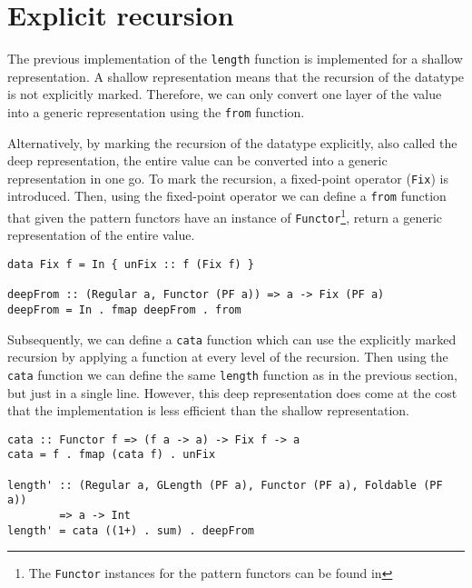 \section{Explicit recursion}
\label{sec-explicit-recursion}


The previous implementation of the \texttt{length} function is implemented for a shallow representation. A shallow representation means that the recursion of the datatype is not explicitly marked. Therefore, we can only convert one layer of the value into a generic representation using the \texttt{from} function. 

Alternatively, by marking the recursion of the datatype explicitly, also called the deep representation, the entire value can be converted into a generic representation in one go. To mark the recursion, a fixed-point operator (\texttt{Fix}) is introduced. Then, using the fixed-point operator we can define a \texttt{from} function that given the pattern functors have an instance of \texttt{Functor}\footnote{The \texttt{Functor} instances for the pattern functors can be found in }, return a generic representation of the entire value.

\begin{verbatim}
data Fix f = In { unFix :: f (Fix f) }

deepFrom :: (Regular a, Functor (PF a)) => a -> Fix (PF a)
deepFrom = In . fmap deepFrom . from
\end{verbatim}

Subsequently, we can define a \texttt{cata} function which can use the explicitly marked recursion by applying a function at every level of the recursion. Then using the \texttt{cata} function we can define the same \texttt{length} function as in the previous section, but just in a single line. However, this deep representation does come at the cost that the implementation is less efficient than the shallow representation. 

\begin{verbatim}
cata :: Functor f => (f a -> a) -> Fix f -> a
cata = f . fmap (cata f) . unFix

length' :: (Regular a, GLength (PF a), Functor (PF a), Foldable (PF a)) 
        => a -> Int
length' = cata ((1+) . sum) . deepFrom
\end{verbatim}